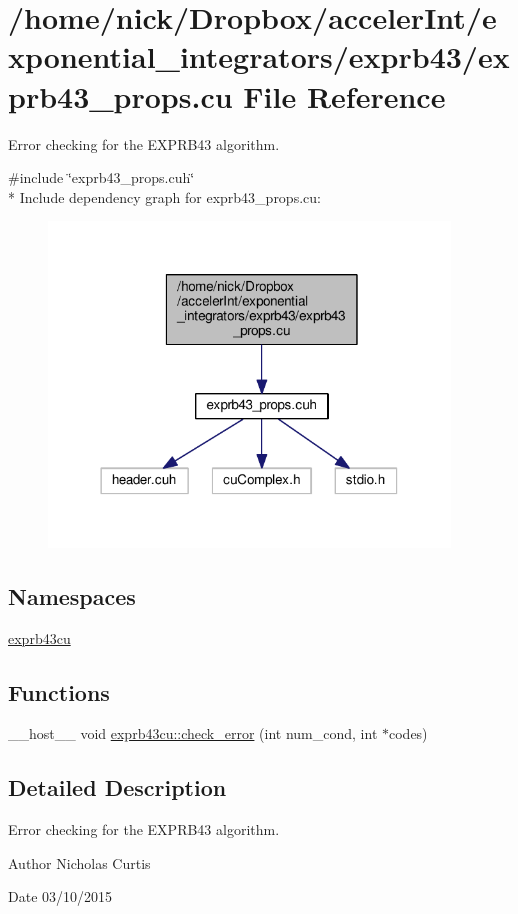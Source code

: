 \hypertarget{exprb43__props_8cu}{}\section{/home/nick/\+Dropbox/acceler\+Int/exponential\+\_\+integrators/exprb43/exprb43\+\_\+props.cu File Reference}
\label{exprb43__props_8cu}


Error checking for the E\+X\+P\+R\+B43 algorithm.  


{\ttfamily \#include \char`\"{}exprb43\+\_\+props.\+cuh\char`\"{}}\\*
Include dependency graph for exprb43\+\_\+props.\+cu\+:
\nopagebreak
\begin{figure}[H]
\begin{center}
\leavevmode
\includegraphics[width=302pt]{exprb43__props_8cu__incl}
\end{center}
\end{figure}
\subsection*{Namespaces}
\begin{DoxyCompactItemize}
\item 
 \hyperlink{namespaceexprb43cu}{exprb43cu}
\end{DoxyCompactItemize}
\subsection*{Functions}
\begin{DoxyCompactItemize}
\item 
\+\_\+\+\_\+host\+\_\+\+\_\+ void \hyperlink{namespaceexprb43cu_aea2a90f02f654f5e485a7bea9c34985f}{exprb43cu\+::check\+\_\+error} (int num\+\_\+cond, int $\ast$codes)
\end{DoxyCompactItemize}


\subsection{Detailed Description}
Error checking for the E\+X\+P\+R\+B43 algorithm. 

\begin{DoxyAuthor}{Author}
Nicholas Curtis 
\end{DoxyAuthor}
\begin{DoxyDate}{Date}
03/10/2015 
\end{DoxyDate}
